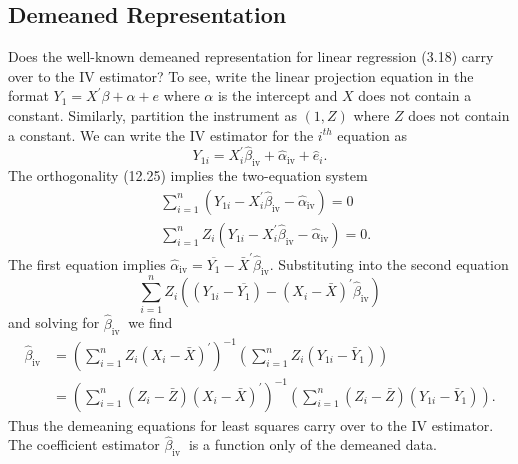 \documentclass[10pt]{article}
\begin{document}
\subsection{Demeaned Representation}
Does the well-known demeaned representation for linear regression (3.18) carry over to the IV estimator? To see, write the linear projection equation in the format $Y_{1}=X^{\prime} \beta+\alpha+e$ where $\alpha$ is the intercept and $X$ does not contain a constant. Similarly, partition the instrument as $(1, Z)$ where $Z$ does not contain a constant. We can write the IV estimator for the $i^{t h}$ equation as
$$
Y_{1 i}=X_{i}^{\prime} \widehat{\beta}_{\mathrm{iv}}+\widehat{\alpha}_{\mathrm{iv}}+\widehat{e}_{i} .
$$
The orthogonality (12.25) implies the two-equation system
$$
\begin{aligned}
&\sum_{i=1}^{n}\left(Y_{1 i}-X_{i}^{\prime} \widehat{\beta}_{\mathrm{iv}}-\widehat{\alpha}_{\mathrm{iv}}\right)=0 \\
&\sum_{i=1}^{n} Z_{i}\left(Y_{1 i}-X_{i}^{\prime} \widehat{\beta}_{\mathrm{iv}}-\widehat{\alpha}_{\mathrm{iv}}\right)=0 .
\end{aligned}
$$
The first equation implies $\widehat{\alpha}_{\mathrm{iv}}=\overline{Y_{1}}-\bar{X}^{\prime} \widehat{\beta}_{\mathrm{iv}}$. Substituting into the second equation
$$
\sum_{i=1}^{n} Z_{i}\left(\left(Y_{1 i}-\overline{Y_{1}}\right)-\left(X_{i}-\bar{X}\right)^{\prime} \widehat{\beta}_{\mathrm{iv}}\right)
$$
and solving for $\widehat{\beta}_{\text {iv }}$ we find
$$
\begin{aligned}
\widehat{\beta}_{\mathrm{iv}} &=\left(\sum_{i=1}^{n} Z_{i}\left(X_{i}-\bar{X}\right)^{\prime}\right)^{-1}\left(\sum_{i=1}^{n} Z_{i}\left(Y_{1 i}-\bar{Y}_{1}\right)\right) \\
&=\left(\sum_{i=1}^{n}\left(Z_{i}-\bar{Z}\right)\left(X_{i}-\bar{X}\right)^{\prime}\right)^{-1}\left(\sum_{i=1}^{n}\left(Z_{i}-\bar{Z}\right)\left(Y_{1 i}-\bar{Y}_{1}\right)\right) .
\end{aligned}
$$
Thus the demeaning equations for least squares carry over to the IV estimator. The coefficient estimator $\widehat{\beta}_{\text {iv }}$ is a function only of the demeaned data.
\end{document}
